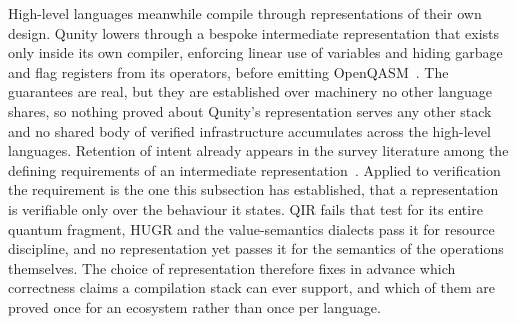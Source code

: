 High-level languages meanwhile compile through representations of their own design.
Qunity lowers through a bespoke intermediate representation that exists only inside its own compiler, enforcing linear use of variables and hiding garbage and flag registers from its operators, before emitting OpenQASM~\cite{mints2025qunity}.
The guarantees are real, but they are established over machinery no other language shares, so nothing proved about Qunity's representation serves any other stack and no shared body of verified infrastructure accumulates across the high-level languages.
Retention of intent already appears in the survey literature among the defining requirements of an intermediate representation~\cite{irreview2024}.
Applied to verification the requirement is the one this subsection has established, that a representation is verifiable only over the behaviour it states.
QIR fails that test for its entire quantum fragment, HUGR and the value-semantics dialects pass it for resource discipline, and no representation yet passes it for the semantics of the operations themselves.
The choice of representation therefore fixes in advance which correctness claims a compilation stack can ever support, and which of them are proved once for an ecosystem rather than once per language.